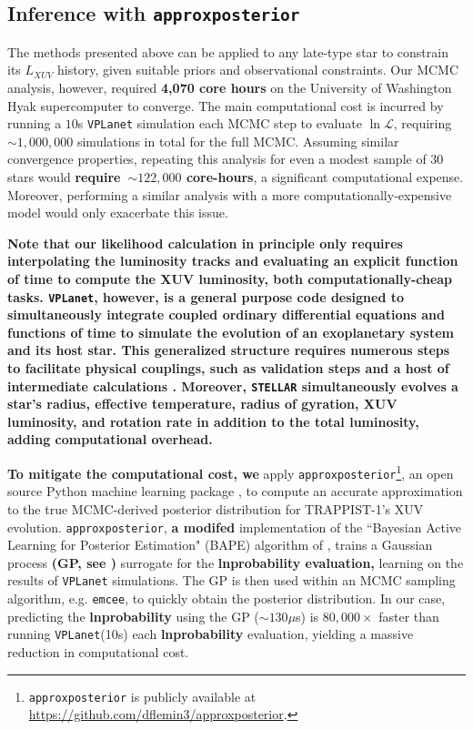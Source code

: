 \documentclass[twocolumn]{aastex62}
\newcommand{\xxx}[1]{{\textbf{#1}}}
\newcommand{\vplanet}[0]{\texttt{VPLanet}\xspace}
\newcommand{\emcee}[0]{\texttt{emcee}\xspace}
\newcommand{\approxposterior}[0]{\texttt{approxposterior}\xspace}
\newcommand{\stellar}[0]{\texttt{STELLAR}\xspace}
\begin{document}
\subsection{Inference with \approxposterior} \label{sec:methods:approx}

The methods presented above can be applied to any late-type star to constrain its $L_{XUV}$ history, given suitable priors and observational constraints. Our MCMC analysis, however, required \xxx{4,070 core hours} on the University of Washington Hyak supercomputer to converge. The main computational cost is incurred by running a $10$s \vplanet simulation each MCMC step to evaluate $\ln \mathcal{L}$, requiring ${\sim}1,000,000$ simulations in total for the full MCMC. Assuming similar convergence properties, repeating this analysis for even a modest sample of 30 stars would \xxx{require~${\sim} 122,000$ core-hours}, a significant computational expense. Moreover, performing a similar analysis with a more computationally-expensive model would only exacerbate this issue.

\xxx{Note that our likelihood calculation in principle only requires interpolating the \citet{Baraffe2015} luminosity tracks and evaluating an explicit function of time to compute the XUV luminosity, both computationally-cheap tasks. \vplanet, however, is a general purpose code designed to simultaneously integrate coupled ordinary differential equations and functions of time to simulate the evolution of an exoplanetary system and its host star. This generalized structure requires numerous steps to facilitate physical couplings, such as validation steps and a host of intermediate calculations \citep[for more details, see][]{Barnes2019}. Moreover, \stellar simultaneously evolves a star's radius, effective temperature, radius of gyration, XUV luminosity, and rotation rate in addition to the total luminosity, adding computational overhead.}

\xxx{To mitigate the computational cost, we} apply \approxposterior\footnote{\approxposterior is publicly available at \href{https://github.com/dflemin3/approxposterior}{https://github.com/dflemin3/approxposterior}.}, an open source Python machine learning package \citep{FlemingVanderPlas2018}, to compute an accurate approximation to the true MCMC-derived posterior distribution for TRAPPIST-1's XUV evolution. \approxposterior, \xxx{a modifed} implementation of the ``Bayesian Active Learning for Posterior Estimation" (BAPE) algorithm of \citet{Kandasamy2017}, trains a Gaussian process \xxx{(GP, see \citet{Rasmussen2006})} surrogate for the \xxx{lnprobability evaluation,} learning on the results of \vplanet simulations. The GP is then used within an MCMC sampling algorithm, e.g. \emcee, to quickly obtain the posterior distribution. In our case, predicting the \xxx{lnprobability} using the GP (${\sim} 130 \mu$s) is $80,000 \times$ faster than running \vplanet (10s) each \xxx{lnprobability} evaluation, yielding a massive reduction in computational cost.
\end{document}
